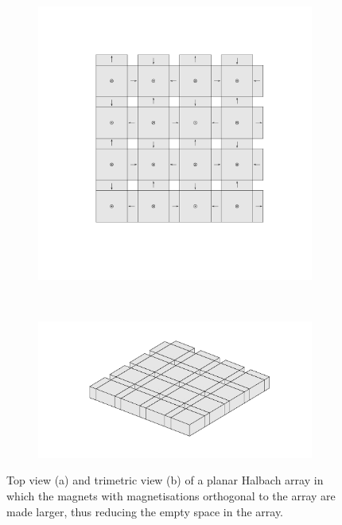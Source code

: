 \begin{figure}
    \centering
    \begin{subfigure}{\linewidth}
        \centering
        \includegraphics[width=\linewidth]{images/cuboidPlanarArrayReducedSpacepdf.pdf}
        \vspace{-25mm}\subcaption{}
    \end{subfigure} \\
    \begin{subfigure}{\linewidth}
        \centering
        \includegraphics[width=\linewidth]{images/cuboidPlanarArrayReducedSpaceAngledpdf.pdf}
        \vspace{-10mm}\subcaption{}
    \end{subfigure}
    \caption{Top view (a) and trimetric view (b) of a planar Halbach array in which the magnets with magnetisations orthogonal to the array are made larger, thus reducing the empty space in the array.}
    \label{fig:planarHalbachArrayModifiedPoles}
\end{figure}
